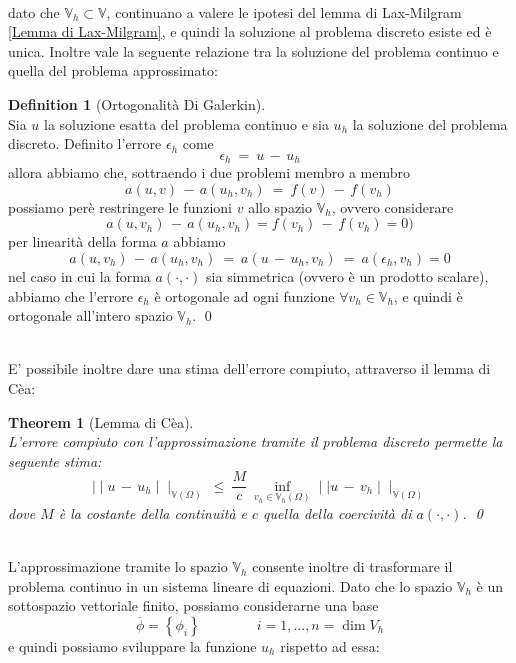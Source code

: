 \documentclass[12pt,a4paper]{report}
\theoremstyle{theorem}
\newtheorem{theorem}{Theorem}[section]
\theoremstyle{theorem}
\theoremstyle{definition}
\newtheorem{definition}{Definition}[section]
\begin{document}
\hfill \\
dato che $\mathbb{V}_{h} \subset \mathbb{V}$, continuano a valere le ipotesi del lemma di Lax-Milgram \ref{Lemma di Lax-Milgram}, e quindi la soluzione al problema discreto esiste ed è unica. Inoltre vale la seguente relazione tra la soluzione del problema continuo e quella del problema approssimato:
\begin{definition} [Ortogonalità Di Galerkin]  \label{Galerkin Orthogonality}
\hfill \\
Sia $u$ la soluzione esatta del problema continuo e sia $u_{h}$ la soluzione del problema discreto. Definito l'errore $\epsilon_{h}$ come
\[ \epsilon_{h} \ = \ u \, - \, u_{h} \]
allora abbiamo che, sottraendo i due problemi membro a membro
\[ a(u,v) \, - \, a(u_{h}, v_{h}) \ =  \ f(v) \, - \, f(v_{h}) \]
possiamo perè restringere le funzioni $v$ allo spazio $\mathbb{V}_h$, ovvero considerare
\[ a(u,v_{h}) \, - \, a(u_{h}, v_{h}) = f(v_{h}) \, - \, f(v_{h}) = 0) \]
per linearità della forma $a$ abbiamo
\[ a(u,v_{h}) \, - \, a(u_{h}, v_{h}) \ =  \ a(u \, - \, u_{h}, v_{h}) \ =  \ a(\epsilon_{h},v_{h}) = 0 \]
nel caso in cui la forma $a(\cdot,\cdot)$ sia simmetrica (ovvero è un prodotto scalare), abbiamo che l'errore $\epsilon_{h}$ è ortogonale ad ogni funzione $\forall v_{h} \in \mathbb{V}_{h}$, e quindi è ortogonale all'intero spazio $\mathbb{V}_{h}$.
\qed
\end{definition}
\hfill \\
E' possibile inoltre dare una stima dell'errore compiuto, attraverso il lemma di Cèa:
\begin{theorem} [Lemma di Cèa]  \label{Lemma Di Cea}
\hfill \\
L'errore compiuto con l'approssimazione tramite il problema discreto permette la seguente stima:
\[ \mid \mid u \, - \, u_{h} \mid \mid_{\mathbb{V}(\Omega)} \ \leq \ \frac{M}{c} \ \inf_{v_{h} \in \mathbb{V}_{h}(\Omega)} \mid \mid u \, - \, v_{h} \mid \mid_{\mathbb{V}(\Omega)} \]
dove $M$ è la costante della continuità e $c$ quella della coercività di $a(\cdot,\cdot)$.
\qed
\end{theorem}
\hfill \\
L'approssimazione tramite lo spazio $\mathbb{V}_{h}$ consente inoltre di trasformare il problema continuo in un sistema lineare di equazioni. Dato che lo spazio $\mathbb{V}_{h}$ è un sottospazio vettoriale finito, possiamo considerarne una base
\[ \overline{\phi} = \left \{ \phi_{i} \right \} \qquad \qquad i = 1,..., n = \dim{V_{h}} \]
e quindi possiamo sviluppare la funzione $u_{h}$ rispetto ad essa:
\end{document}
